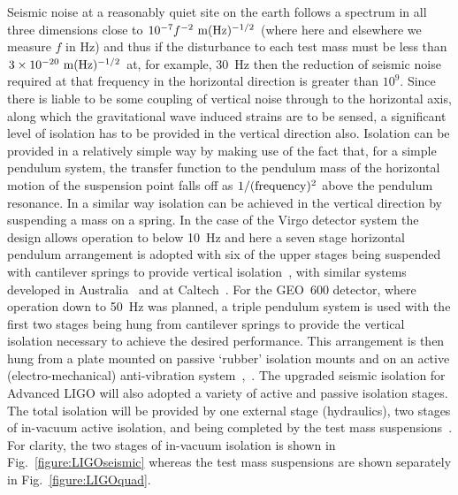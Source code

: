 \documentclass{article}
\begin{document}
Seismic noise at a reasonably quiet site on the earth follows a
spectrum in all three dimensions close to $10^{-7}f^{-2} {\rm \ m}(\rm
Hz)^{-1/2}$ (where here and elsewhere we measure $f$ in Hz) and thus
if the disturbance to each test mass must be less than $3 \times
10^{-20} {\rm \ m}(\rm Hz)^{-1/2}$ at, for example, 30~Hz then the
reduction of seismic noise required at that frequency in the
horizontal direction is greater than $10^{9}$. Since there is liable
to be some coupling of vertical noise through to the horizontal axis,
along which the gravitational wave induced strains are to be sensed, a
significant level of isolation has to be provided in the vertical
direction also. Isolation can be provided in a relatively simple way
by making use of the fact that, for a simple pendulum system, the
transfer function to the pendulum mass of the horizontal motion of the
suspension point falls off as $1/({\rm frequency})^2$ above the
pendulum resonance. In a similar way isolation can be achieved in the
vertical direction by suspending a mass on a spring. In the case of
the Virgo detector system the design allows operation to below 10~Hz
and here a seven stage horizontal pendulum arrangement is adopted with
six of the upper stages being suspended with cantilever springs to
provide vertical isolation~\cite{Braccini}, with similar systems
developed in Australia~\cite{Ju1} and at Caltech~\cite{DeSalvo}. For
the GEO~600 detector, where operation down to 50~Hz was planned, a
triple pendulum system is used with the first two stages being hung
from cantilever springs to provide the vertical isolation necessary to
achieve the desired performance. This arrangement is then hung from a
plate mounted on passive `rubber' isolation mounts and on an active
(electro-mechanical) anti-vibration system~\cite{Plissi1},~\cite{Torrie}. The upgraded seismic isolation for Advanced LIGO will also adopted a variety of active and passive isolation stages. The total isolation will be provided by one external stage (hydraulics), two stages of in-vacuum active isolation, and being completed by the test mass suspensions~\cite{Abbott:2002,Harry:2010}. For clarity, the two stages of in-vacuum isolation is shown in Fig.~\ref{figure:LIGOseismic} whereas the test mass suspensions are shown separately in Fig.~\ref{figure:LIGOquad}.

\end{document}
